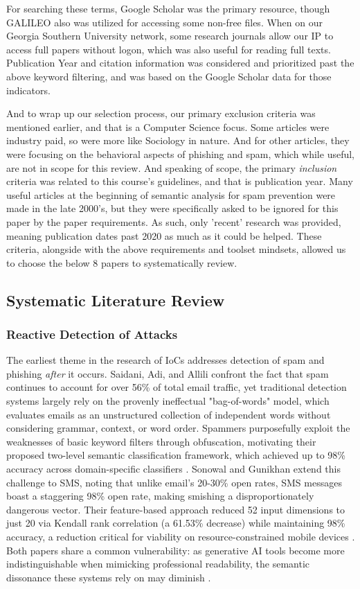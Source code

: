 \documentclass[conference]{IEEEtran}
\begin{document}
For searching these terms, Google Scholar was the primary resource, though GALILEO also was utilized for accessing some non-free files. When on our Georgia Southern University network, some research journals allow our IP to access full papers without logon, which was also useful for reading full texts. Publication Year and citation information was considered and prioritized past the above keyword filtering, and was based on the Google Scholar data for those indicators.

And to wrap up our selection process, our primary exclusion criteria was mentioned earlier, and that is a Computer Science focus.
Some articles were industry paid, so were more like Sociology in nature.
And for other articles, they were focusing on the behavioral aspects of phishing and spam, which while useful, are not in scope for this review.
And speaking of scope, the primary \textit{inclusion} criteria was related to this course's guidelines, and that is publication year.
Many useful articles at the beginning of semantic analysis for spam prevention were made in the late 2000's, but they were specifically asked to be ignored for this paper by the paper requirements.
As such, only 'recent' research was provided, meaning publication dates past 2020 as much as it could be helped.
These criteria, alongside with the above requirements and toolset mindsets, allowed us to choose the below 8 papers to systematically review.
\subsection{Systematic Literature Review}
\subsubsection{Reactive Detection of Attacks}
The earliest theme in the research of IoCs addresses detection of spam and phishing \textit{after} it occurs. Saidani, Adi, and Allili \cite{saidani1} confront the fact that spam continues to account for over 56\% of total email traffic, yet traditional detection systems largely rely on the provenly ineffectual "bag-of-words" model, which evaluates emails as an unstructured collection of independent words without considering grammar, context, or word order. Spammers purposefully exploit the weaknesses of basic keyword filters through obfuscation, motivating their proposed two-level semantic classification framework, which achieved up to 98\% accuracy across domain-specific classifiers \cite{saidani1}. Sonowal and Gunikhan \cite{sonowal1} extend this challenge to SMS, noting that unlike email's 20-30\% open rates, SMS messages boast a staggering 98\% open rate, making smishing a disproportionately dangerous vector. Their feature-based approach reduced 52 input dimensions to just 20 via Kendall rank correlation (a 61.53\% decrease) while maintaining 98\% accuracy, a reduction critical for viability on resource-constrained mobile devices \cite{sonowal1}. Both papers share a common vulnerability: as generative AI tools become more indistinguishable when mimicking professional readability, the semantic dissonance these systems rely on may diminish \cite{sonowal1}.
\end{document}
